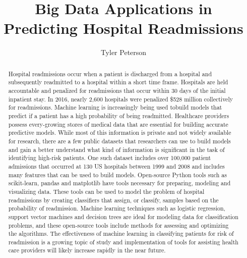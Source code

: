 \documentclass[sigconf]{acmart}
\begin{document}
\title{Big Data Applications in Predicting Hospital Readmissions}

\author{Tyler Peterson}

\renewcommand{\shortauthors}{G. v. Laszewski}


\begin{abstract}

  Hospital readmissions occur when a patient is discharged from a hospital and subsequently readmitted to a hospital within a short time frame. Hospitals are held accountable and penalized for readmissions that occur within 30 days of the initial inpatient stay. In 2016, nearly 2,600 hospitals were penalized \$528 million collectively for readmissions. Machine learning is increasingly being used tobuild models that predict if a patient has a high probability of being readmitted. Healthcare providers possess every-growing stores of medical data that are essential for building accurate predictive models. While most of this information is private and not widely available for research, there are a few public datasets that researchers can use to build models and gain a better understand what kind of information is significant in the task of identifying high-risk patients. One such dataset includes over 100,000 patient admissions that occurred at 130 US hospitals between 1999 and 2008 and includes many features that can be used to build models. Open-source Python tools such as scikit-learn, pandas and matplotlib have tools necessary for preparing, modeling and visualizing data. These tools can be used to model the problem of hospital readmissions by creating classifiers that assign, or classify, samples based on the probability of readmission. Machine learning techniques such as logistic regression, support vector machines and decision trees are ideal for modeling data for classification problems, and these open-source tools include methods for assessing and optimizing the algorithms. The effectiveness of machine learning in classifying patients for risk of readmission is a growing topic of study and implementation of tools for assisting health care providers will likely increase rapidly in the near future.
 
\end{abstract}
\end{document}
